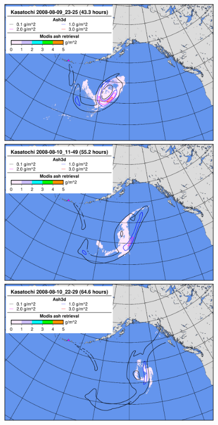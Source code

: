 \begin{figure}[htbp]
\includegraphics[angle=0,scale=0.3]{Figures/TestCase_Results/ValidTest/Kasatochi_CloudLoad_3.pdf}
\includegraphics[angle=0,scale=0.3]{Figures/TestCase_Results/ValidTest/Kasatochi_CloudLoad_4.pdf}
\includegraphics[angle=0,scale=0.3]{Figures/TestCase_Results/ValidTest/Kasatochi_CloudLoad_5.pdf}

\end{figure}
